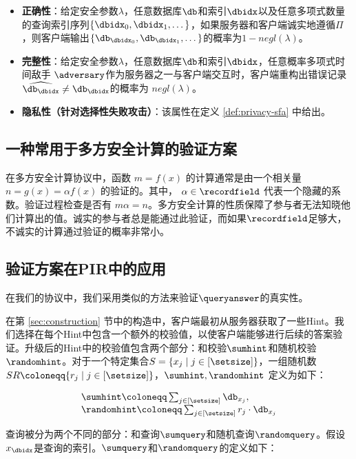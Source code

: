 \begin{definition}
    \begin{itemize}
        \item \textbf{正确性}：给定安全参数$\lambda$，任意数据库$\db$和索引$\dbidx$以及任意多项式数量的查询索引序列$\{\dbidx_0,\dbidx_1, \dots\}$，如果服务器和客户端诚实地遵循$\Pi$，则客户端输出$\{\db_{\dbidx_0},\db_{\dbidx_1}, \dots\}$的概率为$1-negl(\lambda)$。
        \item \textbf{完整性}：给定安全参数$\lambda$，任意数据库$\db$和索引$\dbidx$，任意概率多项式时间敌手 $\adversary$作为服务器之一与客户端交互时，客户端重构出错误记录$\widehat{\db_\dbidx} \neq \db_\dbidx$的概率为 $negl(\lambda)$。
        \item \textbf{隐私性（针对选择性失败攻击）}：该属性在定义 \ref{def:privacy-sfa} 中给出。
    \end{itemize}
\end{definition}
\subsection{一种常用于多方安全计算的验证方案}
在多方安全计算协议中，函数 $m = f(x)$ 的计算通常是由一个相关量 $n = g(x) = \alpha f(x)$ 的验证的。其中， $\alpha \in \recordfield$ 代表一个隐藏的系数。验证过程检查是否有 $m\alpha = n$。多方安全计算的性质保障了参与者无法知晓他们计算出的值。诚实的参与者总是能通过此验证，而如果$\recordfield$足够大，不诚实的计算通过验证的概率非常小。

\subsection{验证方案在PIR中的应用}

在我们的协议中，我们采用类似的方法来验证$\queryanswer$的真实性。

在第 \ref{sec:construction} 节中的构造中，客户端最初从服务器获取了一些Hint。我们选择在每个Hint中包含一个额外的校验值，以使客户端能够进行后续的答案验证。升级后的Hint中的校验值包含两个部分：和校验$\sumhint$和随机校验$\randomhint$。对于一个特定集合$S = \{x_j \mid j\in [\setsize]\}$，一组随机数 $SR\coloneqq \{r_j \mid j\in [\setsize]\}$，$\sumhint, \randomhint$ 定义为如下：

$$
    \begin{array}{l}
        \sumhint \coloneqq  \sum_{j \in [\setsize]} \db_{x_j}, \\
        \randomhint \coloneqq  \sum_{j \in [\setsize]} r_j\cdot \db_{x_j}
    \end{array}
$$

查询被分为两个不同的部分：和查询$\sumquery$和随机查询$\randomquery$。假设$x_\dbidx$是查询的索引。$\sumquery$和$\randomquery$的定义如下：

